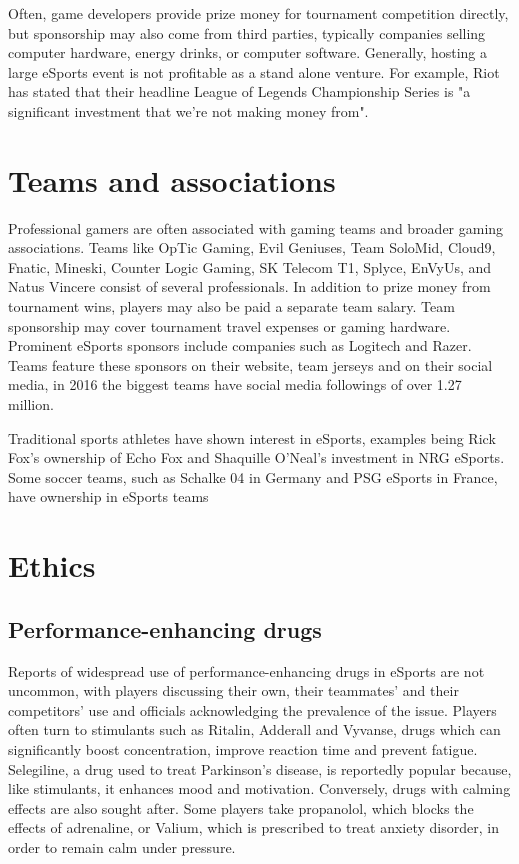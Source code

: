 		Often, game developers provide prize money for tournament competition directly, but sponsorship may also come from third parties, typically companies selling computer hardware, energy drinks, or computer software. Generally, hosting a large eSports event is not profitable as a stand alone venture. For example, Riot has stated that their headline League of Legends Championship Series is "a significant investment that we're not making money from".
\section{Teams and associations}
		Professional gamers are often associated with gaming teams and broader gaming associations. Teams like OpTic Gaming, Evil Geniuses, Team SoloMid, Cloud9, Fnatic, Mineski, Counter Logic Gaming, SK Telecom T1, Splyce, EnVyUs, and Natus Vincere consist of several professionals. In addition to prize money from tournament wins, players may also be paid a separate team salary. Team sponsorship may cover tournament travel expenses or gaming hardware. Prominent eSports sponsors include companies such as Logitech and Razer. Teams feature these sponsors on their website, team jerseys and on their social media, in 2016 the biggest teams have social media followings of over 1.27 million.
		
		Traditional sports athletes have shown interest in eSports, examples being Rick Fox's ownership of Echo Fox and Shaquille O'Neal's investment in NRG eSports. Some soccer teams, such as Schalke 04 in Germany and PSG eSports in France, have ownership in eSports teams
\section{Ethics}
	\subsection{Performance-enhancing drugs}
	Reports of widespread use of performance-enhancing drugs in eSports are not uncommon, with players discussing their own, their teammates' and their competitors' use and officials acknowledging the prevalence of the issue. Players often turn to stimulants such as Ritalin, Adderall and Vyvanse, drugs which can significantly boost concentration, improve reaction time and prevent fatigue. Selegiline, a drug used to treat Parkinson's disease, is reportedly popular because, like stimulants, it enhances mood and motivation. Conversely, drugs with calming effects are also sought after. Some players take propanolol, which blocks the effects of adrenaline, or Valium, which is prescribed to treat anxiety disorder, in order to remain calm under pressure.
